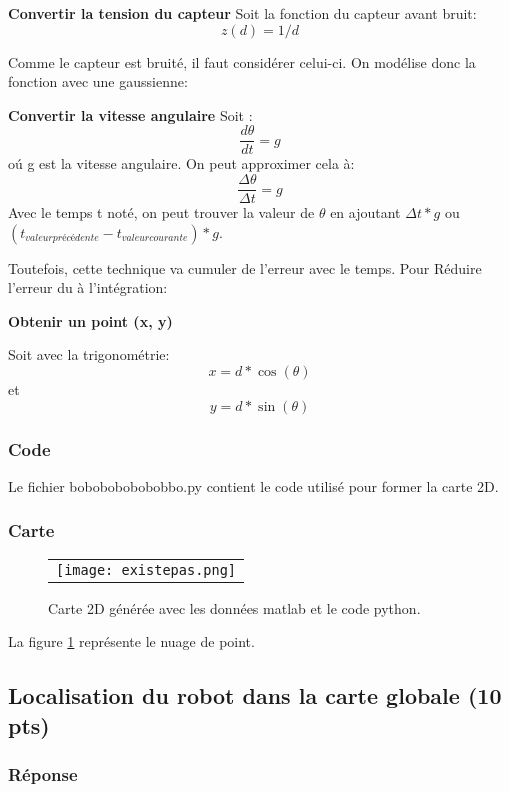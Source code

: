 \documentclass[12pt]{article}
\begin{document}
\textbf{Convertir la tension du capteur}
Soit la fonction du capteur avant bruit:
\[ z(d) = 1/d \]

Comme le capteur est bruité, il faut consid\'erer celui-ci. On mod\'elise donc la fonction avec une gaussienne:
\[ \]

\textbf{Convertir la vitesse angulaire}
Soit :
\[ \frac{d\theta}{dt} = g \] o\'u g est la vitesse angulaire.
On peut approximer cela \`a:
\[ \frac{\Delta \theta}{\Delta t}  = g\]
Avec le temps t noté, on peut trouver la valeur de $\theta$ en ajoutant $\Delta t * g $ ou $ (t_{valeur précédente} - t_{valeur courante}) * g$.

Toutefois, cette technique va cumuler de l'erreur avec le temps.
Pour Réduire l'erreur du à l'intégration:

\textbf{Obtenir un point (x, y)}

Soit avec la trigonométrie:
\[ x = d*\cos(\theta) \] et \[ y = d*\sin(\theta) \]

\subsubsection{Code}
Le fichier bobobobobobobbo.py contient le code utilisé pour former la carte 2D.
\subsubsection{Carte}

\begin{figure}[ht]
 \begin{center}
  \begin{tabular}{c}
    \texttt{[image: existepas.png]}
  \end{tabular}
 \end{center}
\vspace{-0.25in}
 \caption{Carte 2D générée avec les données matlab et le code python.}
    \label{carte-2d-locale}
\end{figure}

La figure \ref{carte-2d-locale} représente le nuage de point.

\newpage
\subsection{Localisation du robot dans la carte globale (10 pts)}

\subsubsection{Réponse}
\end{document}
